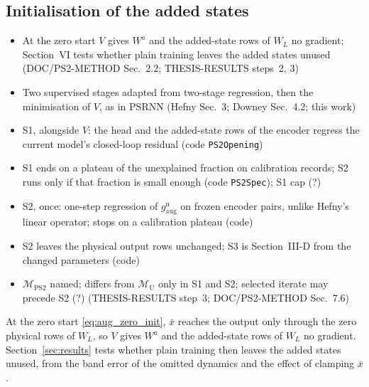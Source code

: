 \subsection{Initialisation of the added states}\label{sec:aug_ps2}
\ifdraft
\begin{itemize}
\item At the zero start $V$ gives $W^a$ and the added-state rows of $W_L$ no gradient; Section~VI tests whether plain training leaves the added states unused (DOC/PS2-METHOD Sec.~2.2; THESIS-RESULTS steps~2, 3)
\item Two supervised stages adapted from two-stage regression, then the minimisation of $V$, as in PSRNN (Hefny Sec.~3; Downey Sec.~4.2; this work)
\item S1, alongside $V$: the head and the added-state rows of the encoder regress the current model's closed-loop residual (code \texttt{PS2Opening})
\item S1 ends on a plateau of the unexplained fraction on calibration records; S2 runs only if that fraction is small enough (code \texttt{PS2Spec}); S1 cap (?)
\item S2, once: one-step regression of $g^{\mathrm n}_{\mathrm{aug}}$ on frozen encoder pairs, unlike Hefny's linear operator; stops on a calibration plateau (code)
\item S2 leaves the physical output rows unchanged; S3 is Section~III-D from the changed parameters (code)
\item $\mathcal M_{\mathrm{PS2}}$ named; differs from $\mathcal M_{\mathrm U}$ only in S1 and S2; selected iterate may precede S2 (?) (THESIS-RESULTS step~3; DOC/PS2-METHOD Sec.~7.6)
\end{itemize}
\fi

At the zero start \eqref{eq:aug_zero_init}, $\bar x$ reaches the output only
through the zero physical rows of $W_L$, so $V$ gives $W^a$ and the
added-state rows of $W_L$ no gradient.
Section~\ref{sec:results} tests whether plain training then leaves the added
states unused, from the band error of the omitted dynamics and the effect of
clamping $\bar x$.

